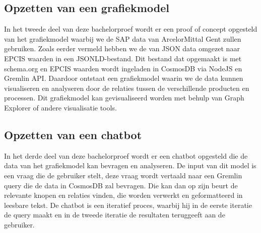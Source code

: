 \subsection{Opzetten van een grafiekmodel}
In het tweede deel van deze bachelorproef wordt er een proof of concept opgesteld van het grafiekmodel waarbij we de SAP data van ArcelorMittal Gent zullen gebruiken.
Zoals eerder vermeld hebben we de van JSON data omgezet naar EPCIS waarden in een JSONLD-bestand. Dit bestand dat opgemaakt is met schema.org en EPCIS waarden wordt ingeladen in CosmosDB via NodeJS en Gremlin API.\@
Daardoor ontstaat een grafiekmodel waarin we de data kunnen visualiseren en analyseren door de relaties tussen de verschillende producten en processen.
Dit grafiekmodel kan gevisualiseerd worden met behulp van Graph Explorer of andere visualisatie tools.


\subsection{Opzetten van een chatbot}
In het derde deel van deze bachelorproef wordt er een chatbot opgesteld die de data van het grafiekmodel kan bevragen en analyseren.
De input van dit model is een vraag die de gebruiker stelt, deze vraag wordt vertaald naar een Gremlin query die de data in CosmosDB zal bevragen.
Die kan dan op zijn beurt de relevante knopen en relaties vinden, die worden verwerkt en geformatteerd in leesbare tekst.
De chatbot is een iteratief proces, waarbij hij in de eerste iteratie de query maakt en in de tweede iteratie de resultaten teruggeeft aan de gebruiker.

